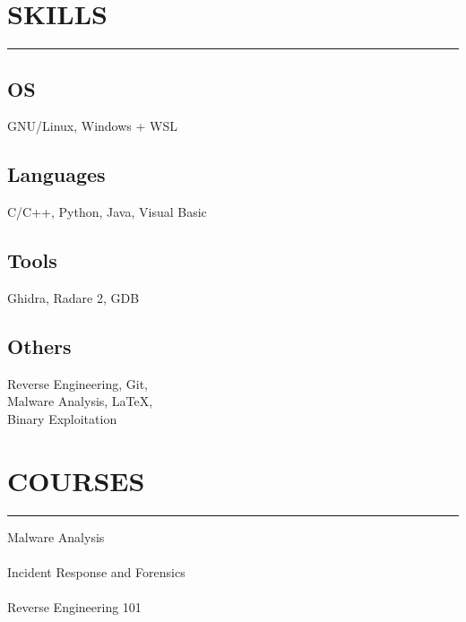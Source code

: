 \documentclass[]{resume}
\begin{document}
\begin{minipage}[t]{0.33\textwidth}

    \section{SKILLS}
    \noindent\rule{5cm}{0.4pt}

    \subsection{OS}
    \noindent GNU/Linux, Windows + WSL

    \vspace{6pt}
    \subsection{Languages}
    \noindent C/C++, Python, Java, Visual Basic

    \vspace{6pt}
    \subsection{Tools}
    \noindent Ghidra, Radare 2, GDB

    \vspace{6pt}
    \subsection{Others}
    \noindent Reverse Engineering, Git,\\
    Malware Analysis, LaTeX,\\
    Binary Exploitation


    \section{COURSES}
    \noindent\rule{5cm}{0.4pt}

    \noindent Malware Analysis\\
    \noindent {}\\

    \vspace{6pt}
    \noindent Incident Response and Forensics\\
    \noindent {}\\

    \vspace{6pt}
    \noindent Reverse Engineering 101\\
    \noindent {}\\

\end{minipage}
\end{document}
